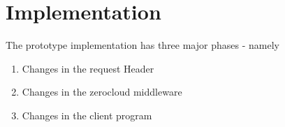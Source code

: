 \section { Implementation}

The prototype implementation has  three major phases - namely

\begin{enumerate}
\item Changes in the request Header
\item Changes in the zerocloud middleware
\item Changes in the client program


\end{enumerate}